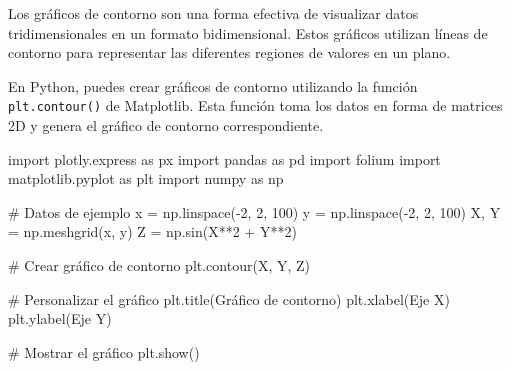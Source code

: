 \documentclass[
  a4paper,
]{article}
\newenvironment{Shaded}{}{}
\newcommand{\CommentTok}[1]{\textcolor[rgb]{0.42,0.45,0.49}{#1}}
\newcommand{\DecValTok}[1]{\textcolor[rgb]{0.00,0.36,0.77}{#1}}
\newcommand{\ImportTok}[1]{\textcolor[rgb]{0.01,0.18,0.38}{#1}}
\newcommand{\NormalTok}[1]{\textcolor[rgb]{0.14,0.16,0.18}{#1}}
\newcommand{\OperatorTok}[1]{\textcolor[rgb]{0.14,0.16,0.18}{#1}}
\newcommand{\StringTok}[1]{\textcolor[rgb]{0.01,0.18,0.38}{#1}}
\begin{document}
Los gráficos de contorno son una forma efectiva de visualizar datos
tridimensionales en un formato bidimensional. Estos gráficos utilizan
líneas de contorno para representar las diferentes regiones de valores
en un plano.

En Python, puedes crear gráficos de contorno utilizando la función
\texttt{plt.contour()} de Matplotlib. Esta función toma los datos en
forma de matrices 2D y genera el gráfico de contorno correspondiente.

\begin{Shaded}
\begin{Highlighting}[]
\ImportTok{import}\NormalTok{ plotly.express }\ImportTok{as}\NormalTok{ px}
\ImportTok{import}\NormalTok{ pandas }\ImportTok{as}\NormalTok{ pd}
\ImportTok{import}\NormalTok{ folium}
\ImportTok{import}\NormalTok{ matplotlib.pyplot }\ImportTok{as}\NormalTok{ plt}
\ImportTok{import}\NormalTok{ numpy }\ImportTok{as}\NormalTok{ np}

\CommentTok{\# Datos de ejemplo}
\NormalTok{x }\OperatorTok{=}\NormalTok{ np.linspace(}\OperatorTok{{-}}\DecValTok{2}\NormalTok{, }\DecValTok{2}\NormalTok{, }\DecValTok{100}\NormalTok{)}
\NormalTok{y }\OperatorTok{=}\NormalTok{ np.linspace(}\OperatorTok{{-}}\DecValTok{2}\NormalTok{, }\DecValTok{2}\NormalTok{, }\DecValTok{100}\NormalTok{)}
\NormalTok{X, Y }\OperatorTok{=}\NormalTok{ np.meshgrid(x, y)}
\NormalTok{Z }\OperatorTok{=}\NormalTok{ np.sin(X}\OperatorTok{**}\DecValTok{2} \OperatorTok{+}\NormalTok{ Y}\OperatorTok{**}\DecValTok{2}\NormalTok{)}

\CommentTok{\# Crear gráfico de contorno}
\NormalTok{plt.contour(X, Y, Z)}

\CommentTok{\# Personalizar el gráfico}
\NormalTok{plt.title(}\StringTok{\textquotesingle{}Gráfico de contorno\textquotesingle{}}\NormalTok{)}
\NormalTok{plt.xlabel(}\StringTok{\textquotesingle{}Eje X\textquotesingle{}}\NormalTok{)}
\NormalTok{plt.ylabel(}\StringTok{\textquotesingle{}Eje Y\textquotesingle{}}\NormalTok{)}

\CommentTok{\# Mostrar el gráfico}
\NormalTok{plt.show()}
\end{Highlighting}
\end{Shaded}
\end{document}
